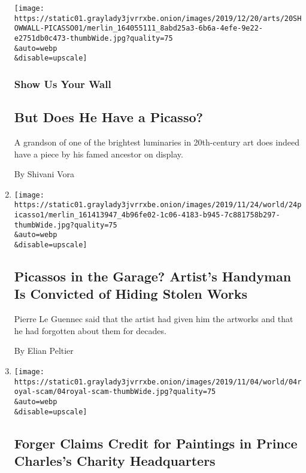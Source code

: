 \begin{enumerate}
  \texttt{[image: https://static01.graylady3jvrrxbe.onion/images/2019/12/20/arts/20SHOWWALL-PICASSO01/merlin\_164055111\_8abd25a3-6b6a-4efe-9e22-e2751db0c473-thumbWide.jpg?quality=75\\\&auto=webp\\\&disable=upscale]}

  \hypertarget{show-us-your-wall}{%
  \subsubsection{Show Us Your Wall}\label{show-us-your-wall}}

  \hypertarget{but-does-he-have-a-picasso}{%
  \subsection{But Does He Have a
  Picasso?}\label{but-does-he-have-a-picasso}}

  A grandson of one of the brightest luminaries in 20th-century art does
  indeed have a piece by his famed ancestor on display.

  By Shivani Vora
\item
  \href{/2019/11/23/world/europe/picasso-electrician-convicted.html}{}

  \texttt{[image: https://static01.graylady3jvrrxbe.onion/images/2019/11/24/world/24picasso1/merlin\_161413947\_4b96fe02-1c06-4183-b945-7c881758b297-thumbWide.jpg?quality=75\\\&auto=webp\\\&disable=upscale]}

  \hypertarget{picassos-in-the-garage-artists-handyman-is-convicted-of-hiding-stolen-works}{%
  \subsection{Picassos in the Garage? Artist's Handyman Is Convicted of
  Hiding Stolen
  Works}\label{picassos-in-the-garage-artists-handyman-is-convicted-of-hiding-stolen-works}}

  Pierre Le Guennec said that the artist had given him the artworks and
  that he had forgotten about them for decades.

  By Elian Peltier
\item
  \href{/2019/11/04/world/europe/prince-charles-fake-art-dumfries-house.html}{}

  \texttt{[image: https://static01.graylady3jvrrxbe.onion/images/2019/11/04/world/04royal-scam/04royal-scam-thumbWide.jpg?quality=75\\\&auto=webp\\\&disable=upscale]}

  \hypertarget{forger-claims-credit-for-paintings-in-prince-charless-charity-headquarters}{%
  \subsection{Forger Claims Credit for Paintings in Prince Charles's
  Charity
  Headquarters}\label{forger-claims-credit-for-paintings-in-prince-charless-charity-headquarters}}


\end{enumerate}
